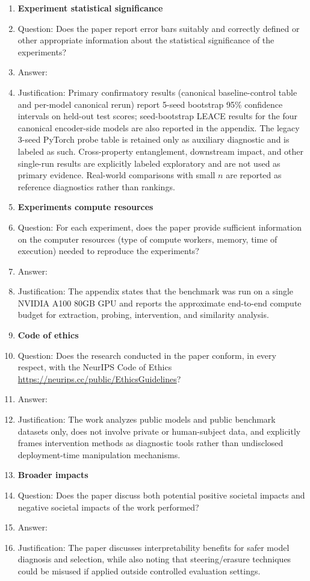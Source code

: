 \begin{enumerate}
\item {\bf Experiment statistical significance}
    \item[] Question: Does the paper report error bars suitably and correctly defined or other appropriate information about the statistical significance of the experiments?
    \item[] Answer: \answerYes{}
    \item[] Justification: Primary confirmatory results (canonical baseline-control table and per-model canonical rerun) report 5-seed bootstrap 95\% confidence intervals on held-out test scores; seed-bootstrap LEACE results for the four canonical encoder-side models are also reported in the appendix. The legacy 3-seed PyTorch probe table is retained only as auxiliary diagnostic and is labeled as such. Cross-property entanglement, downstream impact, and other single-run results are explicitly labeled exploratory and are not used as primary evidence. Real-world comparisons with small $n$ are reported as reference diagnostics rather than rankings.

\item {\bf Experiments compute resources}
    \item[] Question: For each experiment, does the paper provide sufficient information on the computer resources (type of compute workers, memory, time of execution) needed to reproduce the experiments?
    \item[] Answer: \answerYes{}
    \item[] Justification: The appendix states that the benchmark was run on a single NVIDIA A100 80GB GPU and reports the approximate end-to-end compute budget for extraction, probing, intervention, and similarity analysis.

\item {\bf Code of ethics}
    \item[] Question: Does the research conducted in the paper conform, in every respect, with the NeurIPS Code of Ethics \url{https://neurips.cc/public/EthicsGuidelines}?
    \item[] Answer: \answerYes{}
    \item[] Justification: The work analyzes public models and public benchmark datasets only,
    does not involve private or human-subject data, and explicitly frames intervention methods as
    diagnostic tools rather than undisclosed deployment-time manipulation mechanisms.

\item {\bf Broader impacts}
    \item[] Question: Does the paper discuss both potential positive societal impacts and negative societal impacts of the work performed?
    \item[] Answer: \answerYes{}
    \item[] Justification: The paper discusses interpretability benefits for safer model diagnosis and selection, while also noting that steering/erasure techniques could be misused if applied outside controlled evaluation settings.


\end{enumerate}
